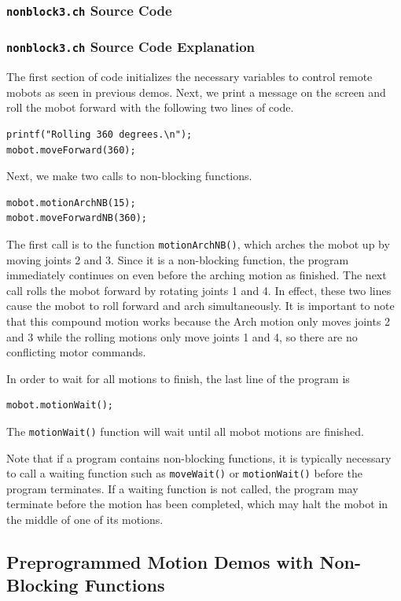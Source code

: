 \documentclass{article}
\begin{document}
\subsubsection{\texttt{nonblock3.ch} Source Code}

\subsubsection{\texttt{nonblock3.ch} Source Code Explanation}
The first section of code initializes the necessary variables to control remote
mobots as seen in previous demos. Next, we print a message on the screen and 
roll the mobot forward with the following two lines of code.
\begin{verbatim}
printf("Rolling 360 degrees.\n");
mobot.moveForward(360);
\end{verbatim}
Next, we make two calls to non-blocking functions.
\begin{verbatim}
mobot.motionArchNB(15);
mobot.moveForwardNB(360);
\end{verbatim}
The first call is to the function \texttt{motionArchNB()}, which arches the mobot
up by moving joints 2 and 3. Since it is a non-blocking function, the program
immediately continues on even before the arching motion as finished. The
next call rolls the mobot forward by rotating joints 1 and 4. In effect, these
two lines cause the mobot to roll forward and arch simultaneously. It is important
to note that this compound motion works because the Arch motion only moves 
joints 2 and 3 while the rolling motions only move joints 1 and 4, so there are
no conflicting motor commands.

In order to wait for all motions to finish, the last line of the program is
\begin{verbatim}
mobot.motionWait();
\end{verbatim}
The \texttt{motionWait()} function will wait until all mobot motions are finished.

Note that
if a program contains non-blocking functions, it is typically necessary to 
call a waiting function such as \texttt{moveWait()} or \texttt{motionWait()}
before the program terminates. If a waiting function is not called, the program
may terminate before the motion has been completed, which may halt the mobot
in the middle of one of its motions.

\subsection{Preprogrammed Motion Demos with Non-Blocking Functions}
\end{document}

